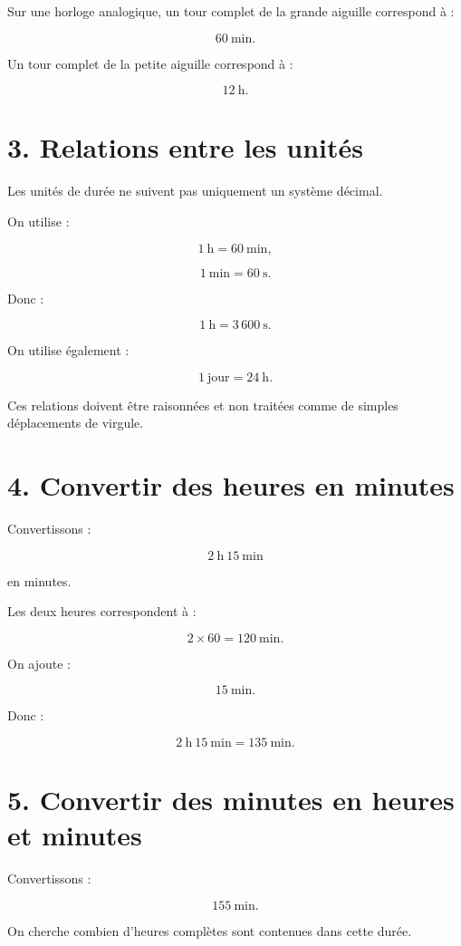 Sur une horloge analogique, un tour complet de la grande aiguille correspond à :

\[
60\ \text{min}.
\]

Un tour complet de la petite aiguille correspond à :

\[
12\ \text{h}.
\]

\section{3. Relations entre les unités}

Les unités de durée ne suivent pas uniquement un système décimal.

On utilise :

\[
1\ \text{h}=60\ \text{min},
\]

\[
1\ \text{min}=60\ \text{s}.
\]

Donc :

\[
1\ \text{h}=3\,600\ \text{s}.
\]

On utilise également :

\[
1\ \text{jour}=24\ \text{h}.
\]

Ces relations doivent être raisonnées et non traitées comme de simples déplacements de virgule.

\section{4. Convertir des heures en minutes}

Convertissons :

\[
2\ \text{h}\ 15\ \text{min}
\]

en minutes.

Les deux heures correspondent à :

\[
2\times60=120\ \text{min}.
\]

On ajoute :

\[
15\ \text{min}.
\]

Donc :

\[
\boxed{
2\ \text{h}\ 15\ \text{min}
=
135\ \text{min}
}.
\]

\section{5. Convertir des minutes en heures et minutes}

Convertissons :

\[
155\ \text{min}.
\]

On cherche combien d’heures complètes sont contenues dans cette durée.

